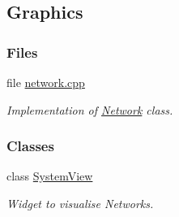 \hypertarget{group___graphics}{}\subsection{Graphics}
\label{group___graphics}
\subsubsection*{Files}
\begin{DoxyCompactItemize}
\item 
file \hyperlink{network_8cpp}{network.\+cpp}
\begin{DoxyCompactList}\small\item\em Implementation of \hyperlink{class_network}{Network} class. \end{DoxyCompactList}\end{DoxyCompactItemize}
\subsubsection*{Classes}
\begin{DoxyCompactItemize}
\item 
class \hyperlink{class_system_view}{System\+View}
\begin{DoxyCompactList}\small\item\em Widget to visualise Networks. \end{DoxyCompactList}\end{DoxyCompactItemize}
